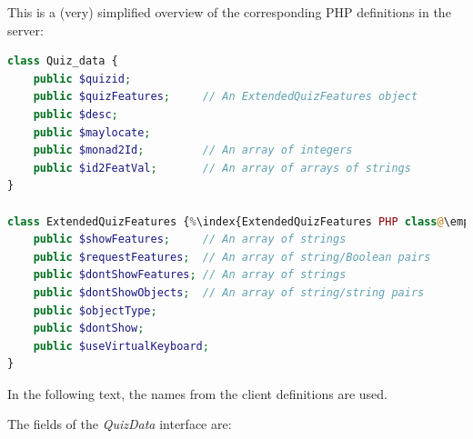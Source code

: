 \documentclass[11pt,oneside,a4paper]{memoir}
\begin{document}
This is a (very) simplified overview of the corresponding PHP definitions in the server:

\begin{lstlisting}[language=PHP]
class Quiz_data {
    public $quizid;
    public $quizFeatures;     // An ExtendedQuizFeatures object
    public $desc;
    public $maylocate;
    public $monad2Id;         // An array of integers
    public $id2FeatVal;       // An array of arrays of strings
}

class ExtendedQuizFeatures {%\index{ExtendedQuizFeatures PHP class@\emph{ExtendedQuizFeatures} PHP class}%
    public $showFeatures;     // An array of strings
    public $requestFeatures;  // An array of string/Boolean pairs
    public $dontShowFeatures; // An array of strings
    public $dontShowObjects;  // An array of string/string pairs
    public $objectType;
    public $dontShow;
    public $useVirtualKeyboard;
}
\end{lstlisting}

In the following text, the names from the client definitions are used.

The fields of the \emph{QuizData} interface are:
\end{document}
